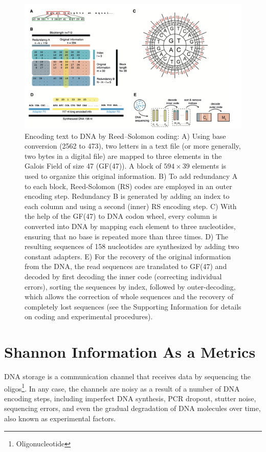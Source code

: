\documentclass[10pt,twocolumn,twoside]{gsajnl}
\theoremstyle{definition}
\begin{document}
\begin{figure}[ht]
    \includegraphics[width=\linewidth]{Figures/reed-solomon-error-correction.png}
    \caption{Encoding text to DNA by Reed–Solomon coding: A) Using base conversion (2562 to 473), two letters in a text file (or more generally, two bytes in a digital file) are mapped to three elements in the Galois Field of size 47 (GF(47)). A block of \(594 \times 39\) elements is used to organize this original information. B) To add redundancy A to each block, Reed-Solomon (RS) codes are employed in an outer encoding step. Redundancy B is generated by adding an index to each column and using a second (inner) RS encoding step. C) With the help of the GF(47) to DNA codon wheel, every column is converted into DNA by mapping each element to three nucleotides, ensuring that no base is repeated more than three times. D) The resulting sequences of 158 nucleotides are synthesized by adding two constant adapters. E) For the recovery of the original information from the DNA, the read sequences are translated to GF(47) and decoded by first decoding the inner code (correcting individual errors), sorting the sequences by index, followed by outer-decoding, which allows the correction of whole sequences and the recovery of completely lost sequences (see the Supporting Information for details on coding and experimental procedures).}
    \centering
   \label{fig6}
\end{figure}

\section{Shannon Information As a Metrics}
\label{sec: Shannon Information As a Metrics}
DNA storage is a communication channel that receives data by sequencing the oligos\footnote{Oligonucleotide}. In any case, the channels are noisy as a result of a number of DNA encoding steps, including imperfect DNA synthesis, PCR dropout, stutter noise, sequencing errors, and even the gradual degradation of DNA molecules over time, also known as experimental factors.
\end{document}
